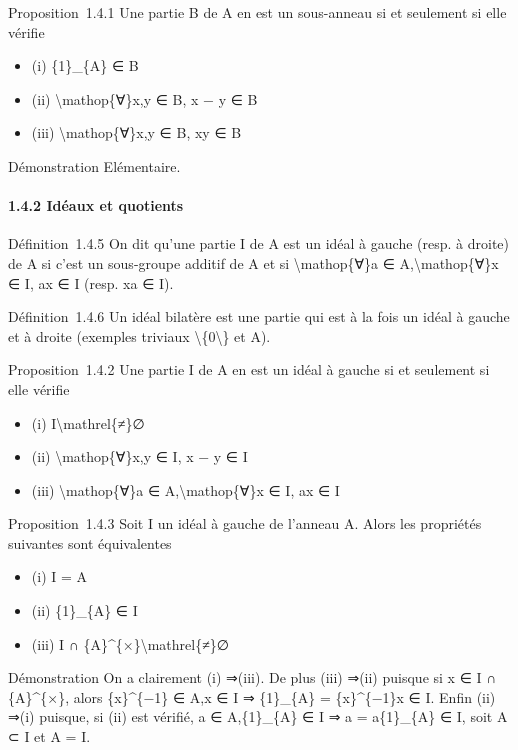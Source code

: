 \documentclass[]{article}
\begin{document}
Proposition~1.4.1 Une partie B de A en est un sous-anneau si et
seulement si elle vérifie

\begin{itemize}
\itemsep1pt\parskip0pt
\item
  (i) \{1\}\_\{A\} ∈ B
\item
  (ii) \textbackslash{}mathop\{∀\}x,y ∈ B, x − y ∈ B
\item
  (iii) \textbackslash{}mathop\{∀\}x,y ∈ B, xy ∈ B
\end{itemize}

Démonstration Elémentaire.

\paragraph{1.4.2 Idéaux et quotients}

Définition~1.4.5 On dit qu'une partie I de A est un idéal à gauche
(resp. à droite) de A si c'est un sous-groupe additif de A et si
\textbackslash{}mathop\{∀\}a ∈ A,\textbackslash{}mathop\{∀\}x ∈ I, ax ∈
I (resp. xa ∈ I).

Définition~1.4.6 Un idéal bilatère est une partie qui est à la fois un
idéal à gauche et à droite (exemples triviaux
\textbackslash{}\{0\textbackslash{}\} et A).

Proposition~1.4.2 Une partie I de A en est un idéal à gauche si et
seulement si elle vérifie

\begin{itemize}
\itemsep1pt\parskip0pt
\item
  (i) I\textbackslash{}mathrel\{≠\}∅
\item
  (ii) \textbackslash{}mathop\{∀\}x,y ∈ I, x − y ∈ I
\item
  (iii) \textbackslash{}mathop\{∀\}a ∈ A,\textbackslash{}mathop\{∀\}x ∈
  I, ax ∈ I
\end{itemize}

Proposition~1.4.3 Soit I un idéal à gauche de l'anneau A. Alors les
propriétés suivantes sont équivalentes

\begin{itemize}
\itemsep1pt\parskip0pt
\item
  (i) I = A
\item
  (ii) \{1\}\_\{A\} ∈ I
\item
  (iii) I ∩ \{A\}\^{}\{×\}\textbackslash{}mathrel\{≠\}∅
\end{itemize}

Démonstration On a clairement (i) ⇒(iii). De plus (iii) ⇒(ii) puisque si
x ∈ I ∩ \{A\}\^{}\{×\}, alors \{x\}\^{}\{−1\} ∈ A,x ∈ I ⇒ \{1\}\_\{A\} =
\{x\}\^{}\{−1\}x ∈ I. Enfin (ii) ⇒(i) puisque, si (ii) est vérifié, a ∈
A,\{1\}\_\{A\} ∈ I ⇒ a = a\{1\}\_\{A\} ∈ I, soit A ⊂ I et A = I.
\end{document}
